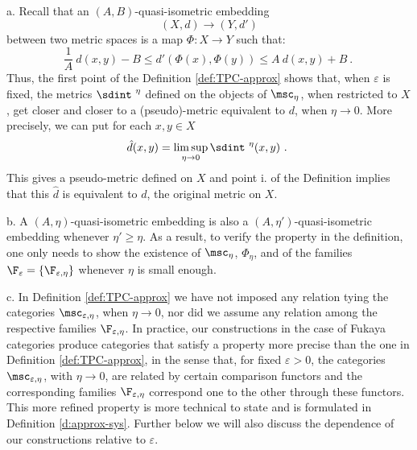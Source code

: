 \begin{rem}\label{rem:relation-TPCapp}
  a. Recall that an $(A,B)$-quasi-isometric embedding
  $$(X,d) \to (Y,d')$$ between two metric spaces is a
  map $\Phi : X\to Y$ such that:
  $$\frac{1}{A}\  d(x,y)-B \leq d'(\Phi(x),\Phi(y))\leq A\ d(x,y)+B~.~$$
  Thus, the first point of the Definition \ref{def:TPC-approx} shows that, when $\varepsilon$ is
  fixed, the metrics
  $\sdint^{\ \eta}$ defined on the objects of $\msc_{\eta}$, when
  restricted to $X$, get closer and closer to a (pseudo)-metric
  equivalent to $d$, when $\eta\to 0$. More precisely, we can put for
  each $x,y\in X$
  $$\hat{d}(x,y)=\limsup_{\eta\to 0} \sdint^{\ \eta} (x,y)~.~$$
  This gives a pseudo-metric defined on $X$ and point i. of the
  Definition implies that this $\hat{d}$ is equivalent to $d$, the
  original metric on $X$.

  b. A $(A,\eta)$-quasi-isometric embedding is also a
  $(A,\eta')$-quasi-isometric embedding whenever $\eta'\geq \eta$. As
  a result, to verify the property in the definition, one only needs
  to show the existence of $\msc_{\eta}$, $\Phi_{\eta}$, and of
  the families $\F_{\varepsilon} =\{\F_{\varepsilon,\eta}\}$ whenever $\eta$ is small enough.


  c. In Definition \ref{def:TPC-approx} we have not imposed any
  relation tying the categories $\msc_{\varepsilon,\eta}$, when
  $\eta \to 0$, nor did we assume any relation among the respective
  families $\F_{\varepsilon,\eta}$.  In practice, our constructions in
  the case of Fukaya categories produce categories that satisfy a
  property more precise than the one in Definition
  \ref{def:TPC-approx}, in the sense that, for fixed $\varepsilon >0$, the
  categories $\msc_{\varepsilon,\eta}$, with $\eta\to 0$, are related by
  certain comparison functors and the corresponding families
  $\F_{\varepsilon,\eta}$ correspond one to the other through these
  functors. This more refined property is more technical to state and
  is formulated in Definition \ref{d:approx-sys}. Further below we
  will also discuss the dependence of our constructions relative to $\varepsilon$.
  
\end{rem}

